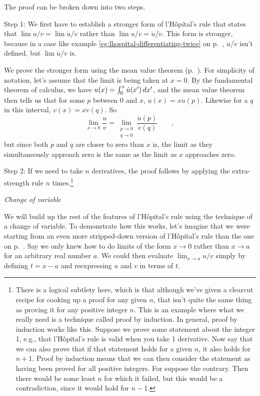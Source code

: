 The proof can be broken down into two steps.

Step 1: We first have to establish a stronger form of l'H\^{o}pital's rule
that states that $\lim u/v=\lim \dot{u}/\dot{v}$ rather than $\lim u/v=\dot{u}/\dot{v}$.
This form is stronger, because in a case like example \ref{eg:lhospital-differentiating-twice} on p.~\pageref{eg:lhospital-differentiating-twice},
$\dot{u}/\dot{v}$ isn't defined, but $\lim \dot{u}/\dot{v}$ is.

We prove the stronger form using the mean value theorem (p.~\pageref{mean-value-theorem-stated}).
For simplicity of notation, let's assume that the limit is being taken at $x=0$. By the fundamental theorem
of calculus, we have $u(x)=\int_0^x \dot{u}(x')\mathop{d\!} x'$, and the mean value theorem then tells us that
for some $p$ between 0 and $x$, $u(x)=x\dot{u}(p)$. Likewise for a $q$ in this interval, $v(x)=x\dot{v}(q)$. 
So
\begin{equation*}
  \lim_{x\rightarrow 0} \frac{u}{v} = \lim_{\substack{p\rightarrow 0 \\q\rightarrow 0}} \frac{\dot{u}(p)}{\dot{v}(q)} \qquad ,
\end{equation*}
but since both $p$ and $q$ are closer to zero than $x$ is, the limit as they simultaneously approach zero is
the same as the limit as $x$ approaches zero.

Step 2: If we need
to take $n$ derivatives, the proof follows by applying the extra-strength rule $n$ times.\footnote{There is a logical
subtlety here, which is that although we've given a clearcut recipe for cooking up a proof for any given
$n$, that isn't quite the same thing as proving it for any positive integer $n$. This is an example where what we really need is a technique called
proof by induction. In general, proof by induction works like this. Suppose we prove some statement
about the integer 1, e.g., that l'H\^{o}pital's rule is valid when you take 1 derivative. Now say
that we can also prove that if that statement holds for a given $n$, it also holds for $n+1$. Proof by
induction means that we can then consider the statement as having been proved for all positive integers.
For suppose the contrary. Then there would be some least $n$ for which it failed, but this would
be a contradiction, since it would hold for $n-1$.}

\emph{Change of variable}

We will build up the rest of the features of l'H\^{o}pital's rule  using the technique of a change of variable. To demonstrate
how this works, let's imagine that we were starting from an even more stripped-down version of l'H\^{o}pital's rule
than the one on p.~\pageref{lhospital-simple}. Say we only knew how to do limits of the form $x\rightarrow0$ rather than
$x\rightarrow a$ for an arbitrary real number $a$. We could then evaluate $\lim_{x\rightarrow a} u/v$ simply
by defining $t=x-a$ and reexpressing $u$ and $v$ in terms of $t$.

